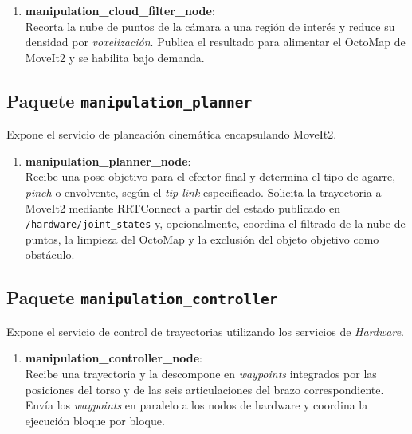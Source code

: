 \begin{enumerate}
    \item \textbf{manipulation\_cloud\_filter\_node}: \\
    Recorta la nube de puntos de la cámara a una región de interés y reduce su densidad por \textit{voxelización}. Publica el resultado para alimentar el OctoMap de MoveIt2 y se habilita bajo demanda.
\end{enumerate}

\subsection{Paquete \texttt{manipulation\_planner}}
Expone el servicio de planeación cinemática encapsulando MoveIt2.

\begin{enumerate}
    \item \textbf{manipulation\_planner\_node}: \\
    Recibe una pose objetivo para el efector final y determina el tipo de agarre, \textit{pinch} o envolvente, según el \textit{tip link} especificado. Solicita la trayectoria a MoveIt2 mediante RRTConnect a partir del estado publicado en \texttt{/hardware/joint\_states} y, opcionalmente, coordina el filtrado de la nube de puntos, la limpieza del OctoMap y la exclusión del objeto objetivo como obstáculo.
\end{enumerate}

\subsection{Paquete \texttt{manipulation\_controller}}
Expone el servicio de control de trayectorias utilizando los servicios de \textit{Hardware}.

\begin{enumerate}
    \item \textbf{manipulation\_controller\_node}: \\
    Recibe una trayectoria y la descompone en \textit{waypoints} integrados por las posiciones del torso y de las seis articulaciones del brazo correspondiente. Envía los \textit{waypoints} en paralelo a los nodos de hardware y coordina la ejecución bloque por bloque.
\end{enumerate}

